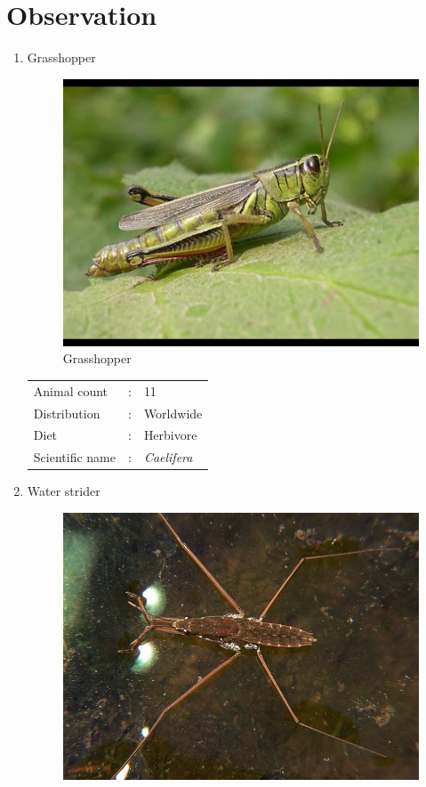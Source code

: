 \documentclass[a4paper, 12pt]{article}
\begin{document}
\section{Observation}
\begin{enumerate}
\item Grasshopper\\

\begin{figure}[H]
\centering
\includegraphics[scale=0.5]{Image/hqdefault.jpg}
\caption{Grasshopper}
\end{figure}
\begin{tabular}{lcl}
Animal count     &:& 11\\
Distribution     &:& Worldwide\\
Diet             &:& Herbivore \\
Scientific name  &:& \textit{Caelifera}
\end{tabular}
\item Water strider\\
\begin{figure}[H]
\centering
\includegraphics[scale=0.3]{Image/800px-Water_strider_G_remigis.jpg}

\end{figure}
\end{enumerate}
\end{document}
